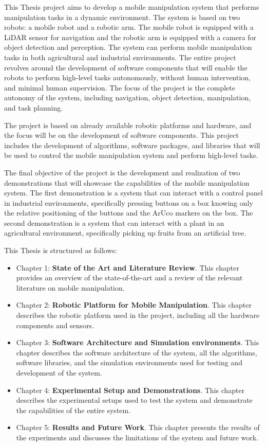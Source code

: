This Thesis project aims to develop a mobile manipulation system that performs manipulation tasks in a
dynamic environment. The system is based on two robots: a mobile robot and a robotic arm. The mobile robot is equipped
with a LiDAR sensor for navigation and the robotic arm is equipped with a camera for object detection and perception.
The system can perform mobile manipulation tasks in both agricultural and industrial environments.
The entire project revolves around the development of software components that will enable the robots to perform
high-level tasks autonomously, without human intervention, and minimal human supervision.
The focus of the project is the complete autonomy of the system, including navigation, object detection, manipulation,
and task planning.

The project is based on already available
robotic platforms and hardware, and the focus will be on the development of software components.
This project includes the development of algorithms, software packages, and libraries that will be
used to control the mobile manipulation system and perform high-level tasks.

The final objective of the project is the development and realization of two demonstrations that will showcase the capabilities
of the mobile manipulation system. The first demonstration is a system that can interact with a control panel in 
industrial environments, specifically pressing buttons on a box knowing only the relative positioning of the buttons
and the ArUco markers on the box. The second demonstration is a system that can interact with a plant in an agricultural
environment, specifically picking up fruits from an artificial tree. 

This Thesis is structured as follows:

\begin{itemize}
    \item Chapter 1: \textbf{State of the Art and Literature Review}. 
    This chapter provides an overview of the state-of-the-art and a review of the relevant literature on mobile manipulation.
    \item Chapter 2: \textbf{Robotic Platform for Mobile Manipulation}.
    This chapter describes the robotic platform used in the project, including all the hardware components and sensors.
    \item Chapter 3: \textbf{Software Architecture and Simulation environments}.
    This chapter describes the software architecture of the system, all the algorithms, software libraries, and the simulation 
    environments used for testing and development of the system.
    \item Chapter 4: \textbf{Experimental Setup and Demonstrations}.
    This chapter describes the experimental setups used to test the system and demonstrate the capabilities of the entire system.
    \item Chapter 5: \textbf{Results and Future Work}.
    This chapter presents the results of the experiments and discusses the limitations of the system and future work.
\end{itemize}